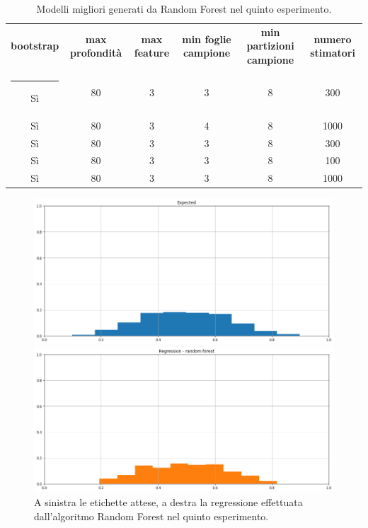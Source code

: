 \documentclass[12pt]{report}
\makeatletter
\theoremstyle{definition}
\newcommand{\thickhline}{%
    \noalign {\ifnum 0=`}\fi \hrule height 1pt
    \futurelet \reserved@a \@xhline
}
\makeatother
\begin{document}
\begin{table}
\centering
\begin{adjustbox}{max width=\textwidth}
 \begin{tabular}{|c|c|c|c|c|c|} 
 \hline
\textbf{bootstrap} & \textbf{max profondità} & \textbf{max feature} & \textbf{min foglie campione} & \textbf{min partizioni campione} & \textbf{numero stimatori}
\\ [0.5ex] 
 \thickhline
 Sì & 80 & 3 & 3 & 8 & 300 \\ 
 Sì & 80 & 3 & 4 & 8 & 1000 \\ 
 Sì & 80 & 3 & 3 & 8 & 300 \\ 
 Sì & 80 & 3 & 3 & 8 & 100 \\ 
 Sì & 80 & 3 & 3 & 8 & 1000 \\ 
 \hline
\end{tabular}
\end{adjustbox}
\caption{Modelli migliori generati da Random Forest nel quinto esperimento.}
\label{models_rf_exp5}
\end{table}

\begin{figure}
\centering
    \begin{minipage}{0.48\textwidth}
        \includegraphics[width=\linewidth]{images/experiment_beta5_sovrapposti/expected_memberships.png}
    \end{minipage}
    \begin{minipage}{0.48\textwidth}
        \includegraphics[width=\linewidth]{images/experiment_beta5_sovrapposti/prediction_regression_rf.png}
    \end{minipage}
    \caption{A sinistra le etichette attese, a destra la regressione effettuata dall'algoritmo Random Forest nel quinto esperimento.}
    \label{rf_exp5}
\end{figure} 
\end{document}
